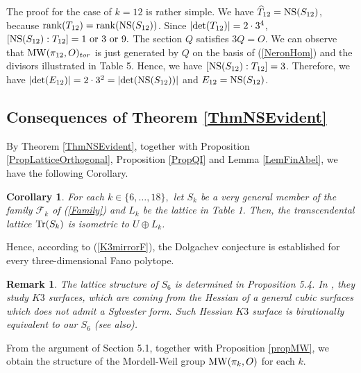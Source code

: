 \documentclass[10pt]{article}
\newtheorem{rem}{Remark}[section]
\newtheorem{cor}{Corollary}[section]
\begin{document}
The proof for the case of $k=12$ is rather simple.
We have $\widehat{T}_{12} = {\rm NS}(S_{12})$, because ${\rm rank}(T_{12})={\rm rank}({\rm NS}(S_{12}))$.
Since $|{\rm det}(T_{12})| = 2 \cdot 3^4$, $\left[{\rm NS}(S_{12}): T_{12} \right]= 1 \text{ or } 3 \text{ or } 9.$ 
The section $Q$ satisfies $3Q=O$.
We can observe that 
${\rm MW}(\pi_{12},O)_{tor}$ is just generated by $Q$
 on the basis of (\ref{NeronHom}) and the divisors illustrated in Table 5.
Hence, we have $[{\rm NS}(S_{12}): T_{12}]=3$. 
Therefore, we have ${|{\rm det}(E_{12})|}=2 \cdot 3^2= |{\rm det}({\rm NS}(S_{12}))| $ and  $E_{12} = {\rm NS}(S_{12})$.



\subsection{Consequences of Theorem \ref{ThmNSEvident}}

 By Theorem \ref{ThmNSEvident}, together with Proposition \ref{PropLatticeOrthogonal}, Proposition \ref{PropQI} and Lemma \ref{LemFinAbel}, we have the following Corollary.
  
 
 \begin{cor}\label{CorTr}
For each $k\in \{6,\ldots,18\},$
let $S_k$ be a very general member of the family $\mathscr{F}_k$ of (\ref{Family})
and $L_k$ be the lattice in Table 1.
Then, the transcendental lattice ${\rm Tr}(S_k)$ is isometric to $U\oplus L_k$.
\end{cor}

Hence, according to (\ref{K3mirrorF}),
the Dolgachev conjecture is established for every three-dimensional Fano polytope.

 \begin{rem}\label{RemHes}
 The lattice structure of  $S_6$ is determined in \cite{DG} Proposition 5.4.
 In \cite{DG}, they study $K3$ surfaces, 
 which are coming from the Hessian of a general cubic surfaces which does not admit a Sylvester form.
 Such Hessian $K3$ surface is birationally equivalent to our $S_6$
 (see  \cite{KHes} also).
 \end{rem}


From the argument  of Section 5.1, 
together with Proposition \ref{propMW}, 
we obtain the structure of the Mordell-Weil group ${\rm MW}(\pi_k, O)$ for each $k$.
\end{document}

